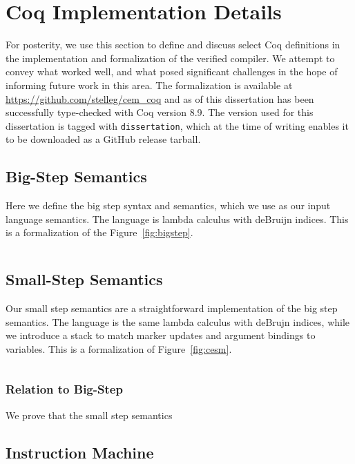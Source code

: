 \chapter{Coq Implementation Details}

For posterity, we use this section to define and discuss select Coq definitions
in the implementation and formalization of the verified compiler. We attempt to
convey what worked well, and what posed significant challenges in the hope of
informing future work in this area. The formalization is available at
\url{https://github.com/stelleg/cem\_coq} and as of this dissertation has been
successfully type-checked with Coq version 8.9. The version used for this
dissertation is tagged with \texttt{dissertation}, which at the time of writing
enables it to be downloaded as a GitHub release tarball.

\section{Big-Step \ce Semantics}
Here we define the big step syntax and semantics, which we use as our input
language semantics. The language is lambda calculus with deBruijn indices.
This is a formalization of the Figure~\ref{fig:bigstep}.

\begin{verbatim}

\end{verbatim}

\section{Small-Step \ce Semantics}
Our small step semantics are a straightforward implementation of the big step
semantics. The language is the same lambda calculus with deBrujn indices, while
we introduce a stack to match marker updates and argument bindings to variables.
This is a formalization of Figure~\ref{fig:cesm}. 

\begin{verbatim}

\end{verbatim}

\subsection{Relation to Big-Step}
We prove that the small step semantics 

\section{Instruction Machine} 

